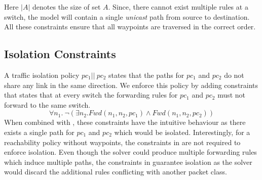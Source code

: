 Here $|A|$ denotes the size of set $A$. 
Since, there cannot exist multiple rules at a switch, the model will contain a 
single {\em unicast} path from source to destination. 
All these constraints ensure that all waypoints are traversed in the correct order. 

\subsection{Isolation Constraints}
A traffic isolation policy $pc_1 || \ pc_2$ states that
the paths for $pc_1$ and $pc_2$ do not share any link in the same direction. 
We enforce this policy by adding constraints that states that at every switch
the forwarding rules for $pc_1$ and $pc_2$ must not forward to the same switch.  
\begin{equation}
	\forall n_1.~\neg ( \exists n_2. Fwd(n_1,n_2,pc_1) \wedge Fwd(n_1,n_2,pc_2)) \label{eq:isolation}
\end{equation}
When combined with , these constraints have the intuitive behaviour 
as there exists a single path for $pc_1$ and
$pc_2$ which would be isolated. 
Interestingly, for a reachability policy without waypoints,  
the constraints in  are not required to enforce isolation. 
Even though the solver could produce multiple forwarding rules which induce multiple paths, 
the constraints in  guarantee isolation as the solver would discard
the additional rules conflicting with another packet class.




